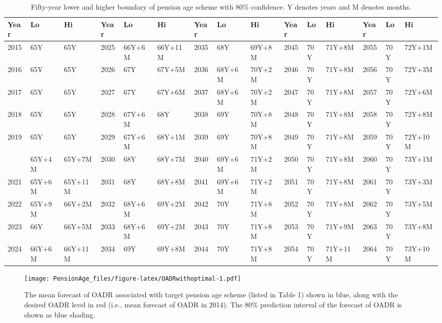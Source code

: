 \documentclass[11pt,a4paper,]{article}
\begin{document}
\begin{table}[t]

\caption{\label{tab:pensionagetables2}Fifty-year lower and higher boundary of pension age scheme with 80\% confidence. Y denotes years and M denotes months.}
\centering
\fontsize{7}{9}\selectfont
\begin{tabular}{lllllllllllllll}
\toprule
Year & Lo & Hi & Year & Lo & Hi & Year & Lo & Hi & Year & Lo & Hi & Year & Lo & Hi\\
\midrule
2015 & 65Y & 65Y & 2025 & 66Y+6M & 66Y+11M & 2035 & 68Y & 69Y+8M & 2045 & 70Y & 71Y+8M & 2055 & 70Y & 72Y+1M\\
2016 & 65Y & 65Y & 2026 & 67Y & 67Y+5M & 2036 & 68Y+6M & 70Y+2M & 2046 & 70Y & 71Y+8M & 2056 & 70Y & 72Y+3M\\
2017 & 65Y & 65Y & 2027 & 67Y & 67Y+6M & 2037 & 68Y+6M & 70Y+2M & 2047 & 70Y & 71Y+8M & 2057 & 70Y & 72Y+6M\\
2018 & 65Y & 65Y & 2028 & 67Y+6M & 68Y & 2038 & 69Y & 70Y+8M & 2048 & 70Y & 71Y+8M & 2058 & 70Y & 72Y+8M\\
2019 & 65Y & 65Y & 2029 & 67Y+6M & 68Y+1M & 2039 & 69Y & 70Y+8M & 2049 & 70Y & 71Y+8M & 2059 & 70Y & 72Y+10M\\
\addlinespace
2020 & 65Y+4M & 65Y+7M & 2030 & 68Y & 68Y+7M & 2040 & 69Y+6M & 71Y+2M & 2050 & 70Y & 71Y+8M & 2060 & 70Y & 73Y+1M\\
2021 & 65Y+6M & 65Y+11M & 2031 & 68Y & 68Y+8M & 2041 & 69Y+6M & 71Y+2M & 2051 & 70Y & 71Y+8M & 2061 & 70Y & 73Y+3M\\
2022 & 65Y+9M & 66Y+2M & 2032 & 68Y+6M & 69Y+2M & 2042 & 70Y & 71Y+8M & 2052 & 70Y & 71Y+8M & 2062 & 70Y & 73Y+5M\\
2023 & 66Y & 66Y+5M & 2033 & 68Y+6M & 69Y+2M & 2043 & 70Y & 71Y+8M & 2053 & 70Y & 71Y+9M & 2063 & 70Y & 73Y+8M\\
2024 & 66Y+6M & 66Y+11M & 2034 & 69Y & 69Y+8M & 2044 & 70Y & 71Y+8M & 2054 & 70Y & 71Y+11M & 2064 & 70Y & 73Y+10M\\
\bottomrule
\end{tabular}
\end{table}

\begin{figure}
\centering
\texttt{[image: PensionAge\_files/figure-latex/OADRwithoptimal-1.pdf]}
\caption{\label{fig:OADRwithoptimal}The mean forecast of OADR associated
with target pension age scheme (listed in Table 1) shown in blue, along
with the desired OADR level in red (i.e., mean forecast of OADR in
2014). The 80\% prediction interval of the forecast of OADR is shown as
blue shading.}
\end{figure}
\end{document}

